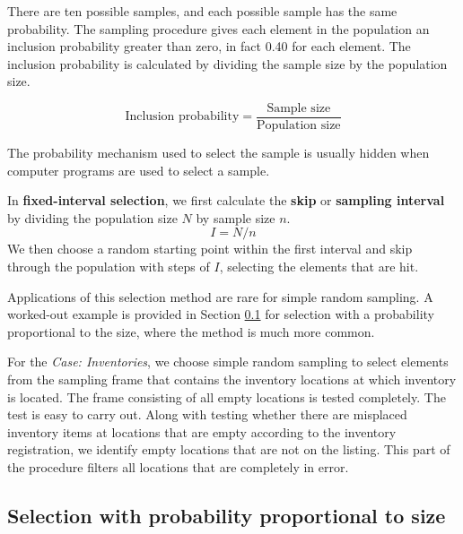 There are ten possible samples, and each possible sample has the same probability. The sampling procedure gives each element in the population an inclusion probability greater than zero, in fact 0.40 for each element. The inclusion probability is calculated by dividing the sample size by the population size.

\begin{equation}
\text{Inclusion probability} = \frac{\text{Sample size}}{\text{Population size}}
\end{equation}

The probability mechanism used to select the sample is usually hidden when computer programs are used to select a sample. 

\bigskip
In \textbf{fixed-interval selection}, we first calculate the \textbf{skip} or \textbf{sampling interval} by dividing the population size $N$ by sample size $n$.
\begin{equation}
I = N / n
\end{equation}
We then choose a random starting point within the first interval and skip through the population with steps of $I$, selecting the elements that are hit. 

Applications of this selection method are rare for simple random sampling. A worked-out example is provided in Section \ref{sub:selection_with_probability_proportional_to_size} for selection with a probability proportional to the size, where the method is much more common.

\bigskip
For the \emph{Case: Inventories}, we choose simple random sampling to select elements from the sampling frame that contains the inventory locations at which inventory is located. The frame consisting of all empty locations is tested completely. The test is easy to carry out. Along with testing whether there are misplaced inventory items at locations that are empty according to the inventory registration, we identify empty locations that are not on the listing. This part of the procedure filters all locations that are completely in error. 


\subsection{Selection with probability proportional to size} %
\label{sub:selection_with_probability_proportional_to_size}

